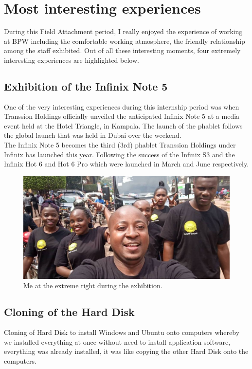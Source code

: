 \section{Most interesting experiences}
During this Field Attachment period, I really enjoyed the experience of working at BPW
including  the  comfortable  working  atmosphere, the friendly relationship among the staff exhibited. Out of all these interesting moments, four extremely interesting experiences are highlighted below.
\subsection{Exhibition of the Infinix Note 5}
One of the very interesting experiences during this internship period was when 
Transsion Holdings officially unveiled the anticipated Infinix Note 5 at a media event held at the Hotel Triangle, in Kampala. The launch of the phablet follows the global launch that was held in Dubai over the weekend. \\
The Infinix Note 5 becomes the third (3rd) phablet Transsion Holdings under Infinix has launched this year. Following the success of the Infinix S3 and the Infinix Hot 6 and Hot 6 Pro which were launched in March and June respectively.

\begin{figure}[h!]
\begin{center}
	\includegraphics[scale=0.4]{img/klaus.jpg}
	\caption{Me at the extreme right during the exhibition.}
	\label{fig:symbols}
\end{center}
\end{figure}
\newpage
\subsection{Cloning of the Hard Disk}
\noindent Cloning of Hard Disk to install Windows and Ubuntu onto computers whereby
we installed everything at once without need to install application software,
everything was already installed, it was like copying the other Hard Disk onto
the computers.


